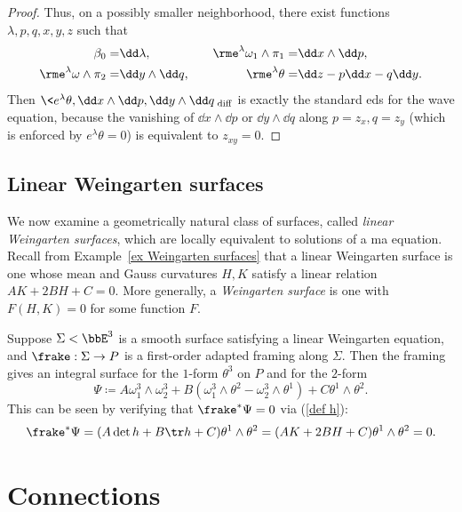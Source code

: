 \begin{proof}
    Thus, on a possibly smaller neighborhood, there exist functions $\lambda,p,q,x,y,z$ such that 
    \begin{align}
        \beta_0=&\dd \lambda, \quad&
        \rme^{\lambda}\omega_1\wedge\pi_1=&\dd x\wedge \dd p,\\
        \rme^\lambda\omega\wedge\pi_2=&\dd y\wedge \dd q, \quad&
        \rme^\lambda\theta=&\dd z-p\dd x-q\dd y.
    \end{align}
    Then $\<e^\lambda\theta,\dd x\wedge\dd p,\dd y\wedge \dd q\>_{\mathrm{diff}}$ is exactly the standard \gls{eds} for the wave equation, because the vanishing of $\dd x\wedge\dd p$ or $\dd y\wedge \dd q$ along $p=z_x,q=z_y$ (which is enforced by $e^\lambda\theta=0$) is equivalent to $z_{xy}=0$.
\end{proof}



\subsection{Linear Weingarten surfaces}

We now examine a geometrically natural class of surfaces, called \emph{linear Weingarten surfaces}, which are locally equivalent to solutions of a \gls{ma} equation. Recall from Example~\ref{ex Weingarten surfaces} that a linear Weingarten surface is one whose mean and Gauss curvatures $H,K$ satisfy a linear relation $AK+2BH+C=0$. More generally, a \emph{Weingarten surface} is one with $F(H,K)=0$ for some function $F$.

Suppose $\Sigma <\bbE^3$ is a smooth surface satisfying a linear Weingarten equation, and $\frake:\Sigma\to P$ is a first-order adapted framing along $\Sigma$. Then the framing gives an integral surface for the $1$-form $\theta^3$ on $P$ and for the $2$-form 
\[\Psi\coloneqq A\omega_1^3 \wedge\omega_2^3+B(\omega_1^3\wedge\theta^2-\omega_2^3\wedge\theta^1)+C\theta^1\wedge\theta^2.\]
This can be seen by verifying that $\frake^\ast \Psi=0$ via (\ref{def h}):
\[\frake^\ast\Psi=(A\det h+B\tr h+C)\theta^1\wedge\theta^2=(AK+2BH+C)\theta^1\wedge\theta^2=0.\]














\newpage
\section{Connections}

